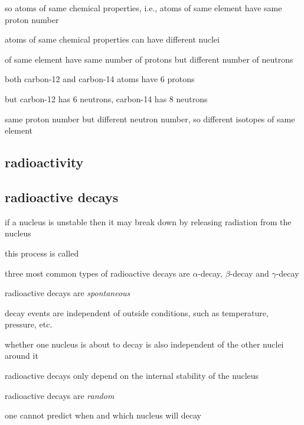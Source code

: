 so atoms of same chemical properties, i.e., atoms of same element have same proton number

\cmt atoms of same chemical properties can have different nuclei

 of same element have same number of protons but different number of neutrons






\begin{soln} both carbon-12 and carbon-14 atoms have 6 protons

but carbon-12 has 6 neutrons, carbon-14 has 8 neutrons

same proton number but different neutron number, so different isotopes of same element \end{soln}




\subsection{radioactivity}

\subsection{radioactive decays}

if a nucleus is unstable then it may break down by releasing radiation from the nucleus

this process is called 

\cmt three most common types of radioactive decays are $\alpha$-decay, $\beta$-decay and $\gamma$-decay

\cmt radioactive decays are \emph{spontaneous}

decay events are independent of outside conditions, such as temperature, pressure, etc.

whether one nucleus is about to decay is also independent of the other nuclei around it

radioactive decays only depend on the internal stability of the nucleus

\cmt radioactive decays are \emph{random}

one cannot predict when and which nucleus will decay

